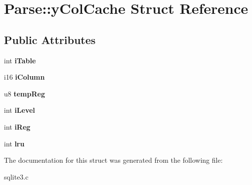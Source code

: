 \hypertarget{structParse_1_1yColCache}{}\section{Parse\+:\+:y\+Col\+Cache Struct Reference}
\label{structParse_1_1yColCache}
\subsection*{Public Attributes}
\begin{DoxyCompactItemize}
\item 
int {\bfseries i\+Table}\hypertarget{structParse_1_1yColCache_a7d99a4e00555cb0ff7fb3990bb7b549e}{}\label{structParse_1_1yColCache_a7d99a4e00555cb0ff7fb3990bb7b549e}

\item 
i16 {\bfseries i\+Column}\hypertarget{structParse_1_1yColCache_a61384f3e70790b1e3058eae8b893fbb9}{}\label{structParse_1_1yColCache_a61384f3e70790b1e3058eae8b893fbb9}

\item 
u8 {\bfseries temp\+Reg}\hypertarget{structParse_1_1yColCache_a61561cab1ce2e1914083777ae84c8fe8}{}\label{structParse_1_1yColCache_a61561cab1ce2e1914083777ae84c8fe8}

\item 
int {\bfseries i\+Level}\hypertarget{structParse_1_1yColCache_a656ea77cf538db00249221de58fd9066}{}\label{structParse_1_1yColCache_a656ea77cf538db00249221de58fd9066}

\item 
int {\bfseries i\+Reg}\hypertarget{structParse_1_1yColCache_aadb47e545234142bd1e9ca4803953ab0}{}\label{structParse_1_1yColCache_aadb47e545234142bd1e9ca4803953ab0}

\item 
int {\bfseries lru}\hypertarget{structParse_1_1yColCache_ac163bb2b692f3037054f92294322f999}{}\label{structParse_1_1yColCache_ac163bb2b692f3037054f92294322f999}

\end{DoxyCompactItemize}


The documentation for this struct was generated from the following file\+:\begin{DoxyCompactItemize}
\item 
sqlite3.\+c\end{DoxyCompactItemize}
